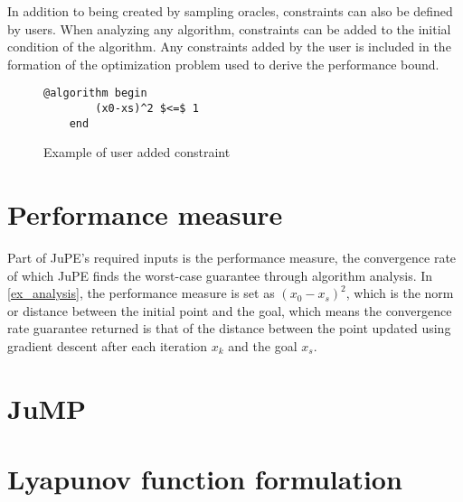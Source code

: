 In addition to being created by sampling oracles, constraints can also be defined by users. When analyzing any algorithm, constraints can be added to the initial condition of the algorithm. Any constraints added by the user is included in the formation of the optimization problem used to derive the performance bound.

\begin{figure}[hbtp]
	\caption{Example of user added constraint}
	\label{ex_user_constraints}
	\begin{lstlisting}[mathescape]
	@algorithm begin
		(x0-xs)^2 $<=$ 1
	end
	\end{lstlisting}
\end{figure}
\section{Performance measure}
Part of JuPE's required inputs is the performance measure, the convergence rate of which JuPE finds the worst-case guarantee through algorithm analysis. In \ref{ex_analysis}, the performance measure is set as $ (x_0 - x_s) ^2 $, which is the norm or distance between the initial point and the goal, which means the convergence rate guarantee returned is that of the distance between the point updated using gradient descent after each iteration $ x_k $ and the goal $ x_s $.
\section{JuMP}
 
\section{Lyapunov function formulation}